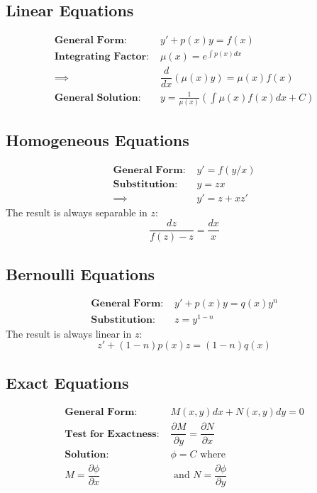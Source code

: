 \documentclass[10pt,leqno]{article}
\begin{document}
\begin{multicols}{2}
\subsection*{Linear Equations}
\begin{align}
\textbf{General Form:\ }& y'+p(x)y=f(x)\\
\textbf{Integrating Factor:\ }& \mu(x) = e^{\int p(x)dx}\\
\implies & \dfrac{d}{dx}\left( \mu(x) y \right) = \mu(x) f(x)\\
\textbf{General Solution:\ }& y=\frac{1}{\mu(x)}\left( \int \mu(x) f(x) dx + C\right)
\end{align}
\subsection*{Homogeneous Equations}
\begin{align}
\textbf{General Form:\ }& y'=f(y/x)\\
\textbf{Substitution:\ }& y=zx \\ \implies & y'=z + xz'
\end{align}
The result is always separable in $z$: 
\begin{equation}
\dfrac{dz}{f(z)-z} = \dfrac{dx}{x}
\end{equation}
\subsection*{Bernoulli Equations}
\begin{align}
\textbf{General Form:\ }& y'+p(x)y=q(x)y^n\\
\textbf{Substitution:\ }& z = y^{1-n}
\end{align}
The result is always linear in $z$:
\begin{equation}
 z' +(1-n)p(x) z = (1-n)q(x)
\end{equation}
\subsection*{Exact Equations}
\begin{align}
\textbf{General Form:\ }& M(x,y)dx + N(x,y)dy = 0 \\
\textbf{Test for Exactness:\ }& \dfrac{\partial M}{\partial y}=\dfrac{\partial N}{\partial x}\\
\textbf{Solution:\ }& \phi=C\text{ where }\\
 M=\dfrac{\partial \phi}{\partial x}&\text{ and } N=\dfrac{\partial \phi}{\partial y}
\end{align}
\columnbreak


\end{multicols}
\end{document}
